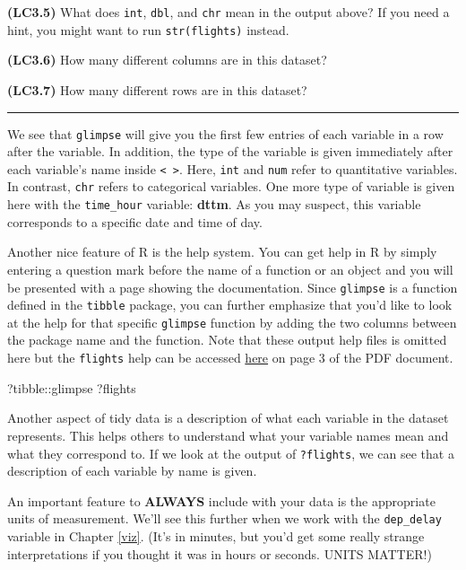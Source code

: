 \documentclass[]{tufte-book}
\newenvironment{Shaded}{\begin{snugshade}}{\end{snugshade}}
\newcommand{\NormalTok}[1]{{#1}}
\let\oldrule=\rule
\renewcommand{\rule}[1]{\oldrule{\linewidth}}
\begin{document}
\textbf{(LC3.5)} What does \texttt{int}, \texttt{dbl}, and \texttt{chr}
mean in the output above? If you need a hint, you might want to run
\texttt{str(flights)} instead.

\textbf{(LC3.6)} How many different columns are in this dataset?

\textbf{(LC3.7)} How many different rows are in this dataset?

\begin{center}\rule{0.5\linewidth}{\linethickness}\end{center}

We see that \texttt{glimpse} will give you the first few entries of each
variable in a row after the variable. In addition, the type of the
variable is given immediately after each variable's name inside
\texttt{\textless{}\ \textgreater{}}. Here, \texttt{int} and
\texttt{num} refer to quantitative variables. In contrast, \texttt{chr}
refers to categorical variables. One more type of variable is given here
with the \texttt{time\_hour} variable: \textbf{dttm}. As you may
suspect, this variable corresponds to a specific date and time of day.

Another nice feature of R is the help system. You can get help in R by
simply entering a question mark before the name of a function or an
object and you will be presented with a page showing the documentation.
Since \texttt{glimpse} is a function defined in the \texttt{tibble}
package, you can further emphasize that you'd like to look at the help
for that specific \texttt{glimpse} function by adding the two columns
between the package name and the function. Note that these output help
files is omitted here but the \texttt{flights} help can be accessed
\href{https://cran.r-project.org/web/packages/nycflights13/nycflights13.pdf}{here}
on page 3 of the PDF document.

\begin{Shaded}
\begin{Highlighting}[]
\NormalTok{?tibble::glimpse}
\NormalTok{?flights}
\end{Highlighting}
\end{Shaded}

Another aspect of tidy data is a description of what each variable in
the dataset represents. This helps others to understand what your
variable names mean and what they correspond to. If we look at the
output of \texttt{?flights}, we can see that a description of each
variable by name is given.

An important feature to \textbf{ALWAYS} include with your data is the
appropriate units of measurement. We'll see this further when we work
with the \texttt{dep\_delay} variable in Chapter \ref{viz}. (It's in
minutes, but you'd get some really strange interpretations if you
thought it was in hours or seconds. UNITS MATTER!)
\end{document}
